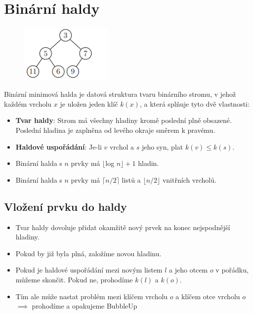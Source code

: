 \documentclass{szzclass}
\author{Daniel Hampl}
\begin{document}

\tableofcontents
\newpage

\section{Binární haldy}

\begin{figure}[h]
\centering
\includegraphics[width=0.4\textwidth]{topics/bi-spol-5/images/binary-heap.png}
\end{figure}

Binární minimová halda je datová struktura tvaru binárního
stromu, v jehož každém vrcholu $x$ je uložen jeden klíč $k(x)$, a která
splňuje tyto dvě vlastnosti:
\begin{itemize}
    \item \textbf{Tvar haldy}: Strom má všechny hladiny kromě poslední plně
    obsazené. Poslední hladina je zaplněna od levého okraje směrem k pravému.
    \item \textbf{Haldové uspořádání}: Je-li $v$ vrchol a $s$ jeho syn, plat $k(v) ≤ k(s)$.
    \item Binární halda s $n$ prvky má $\lfloor $log $ n \rfloor + 1$ hladin.
    \item Binární halda s $n$ prvky má $\lceil n/2\rceil$ listů a $\lfloor n/2 \rfloor$ vnitřních vrcholů.
\end{itemize}

\subsection{Vložení prvku do haldy}
\begin{itemize}
    \item Tvar haldy dovoluje přidat okamžitě nový prvek na konec nejspodnější hladiny.
    \item Pokud by již byla plná, založíme novou hladinu.
    \item Pokud je haldové uspořádání mezi novým listem $l$ a jeho otcem $o$ v pořádku, můžeme skončit. Pokud ne, prohodíme $k(l)$ a $k(o)$.
    \item Tím ale může nastat problém mezi klíčem vrcholu $o$ a klíčem otce vrcholu $o$ $\implies$  prohodíme a opakujeme BubbleUp
\end{itemize}
\end{document}
